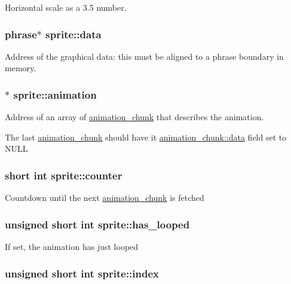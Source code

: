Horizontal scale as a 3.5 number. \hypertarget{structsprite_b69855ef4624739b70f9879bc51014b4}{
\subsubsection{\setlength{\rightskip}{0pt plus 5cm}phrase$\ast$ {\bf sprite::data}}}
\label{structsprite_b69855ef4624739b70f9879bc51014b4}


Address of the graphical data: this must be aligned to a phrase boundary in memory. \hypertarget{structsprite_988af45ecb82acc80fc1e3394abc2b9b}{
\subsubsection{$\ast$ {\bf sprite::animation}}}
\label{structsprite_988af45ecb82acc80fc1e3394abc2b9b}


Address of an array of \hyperlink{structanimation__chunk}{animation\_\-chunk} that describes the animation.

The last \hyperlink{structanimation__chunk}{animation\_\-chunk} should have it \hyperlink{structanimation__chunk_c8b4bbde4238c5c624957d1d467147b5}{animation\_\-chunk::data} field set to NULL \hypertarget{structsprite_fa753f2b34391a607597d94eb97297ab}{
\subsubsection{\setlength{\rightskip}{0pt plus 5cm}short int {\bf sprite::counter}}}
\label{structsprite_fa753f2b34391a607597d94eb97297ab}


Countdown until the next \hyperlink{structanimation__chunk}{animation\_\-chunk} is fetched \hypertarget{structsprite_5be8ecba0a815b906800a772c8b27403}{
\subsubsection{\setlength{\rightskip}{0pt plus 5cm}unsigned short int {\bf sprite::has\_\-looped}}}
\label{structsprite_5be8ecba0a815b906800a772c8b27403}


If set, the animation has just looped \hypertarget{structsprite_f328047fc796240e70e71bff779c00eb}{
\subsubsection{\setlength{\rightskip}{0pt plus 5cm}unsigned short int {\bf sprite::index}}}
\label{structsprite_f328047fc796240e70e71bff779c00eb}


